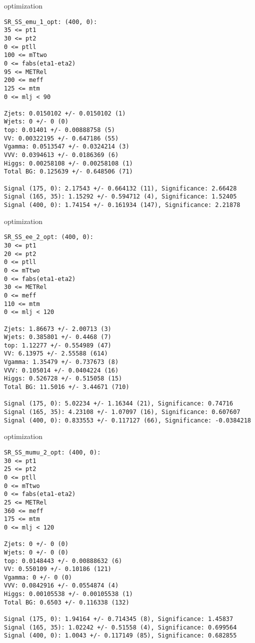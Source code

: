 \begin{frame}[fragile]{optimization}
\tiny
\begin{verbatim}
SR_SS_emu_1_opt: (400, 0):
35 <= pt1
30 <= pt2
0 <= ptll
100 <= mTtwo
0 <= fabs(eta1-eta2)
95 <= METRel
200 <= meff
125 <= mtm
0 <= mlj < 90

Zjets: 0.0150102 +/- 0.0150102 (1)
Wjets: 0 +/- 0 (0)
top: 0.01401 +/- 0.00888758 (5)
VV: 0.00322195 +/- 0.647186 (55)
Vgamma: 0.0513547 +/- 0.0324214 (3)
VVV: 0.0394613 +/- 0.0186369 (6)
Higgs: 0.00258108 +/- 0.00258108 (1)
Total BG: 0.125639 +/- 0.648506 (71)

Signal (175, 0): 2.17543 +/- 0.664132 (11), Significance: 2.66428
Signal (165, 35): 1.15292 +/- 0.594712 (4), Significance: 1.52405
Signal (400, 0): 1.74154 +/- 0.161934 (147), Significance: 2.21878
\end{verbatim}
\end{frame}

\begin{frame}[fragile]{optimization}
\tiny
\begin{verbatim}
SR_SS_ee_2_opt: (400, 0):
30 <= pt1
20 <= pt2
0 <= ptll
0 <= mTtwo
0 <= fabs(eta1-eta2)
30 <= METRel
0 <= meff
110 <= mtm
0 <= mlj < 120

Zjets: 1.86673 +/- 2.00713 (3)
Wjets: 0.385801 +/- 0.4468 (7)
top: 1.12277 +/- 0.554989 (47)
VV: 6.13975 +/- 2.55588 (614)
Vgamma: 1.35479 +/- 0.737673 (8)
VVV: 0.105014 +/- 0.0404224 (16)
Higgs: 0.526728 +/- 0.515058 (15)
Total BG: 11.5016 +/- 3.44671 (710)

Signal (175, 0): 5.02234 +/- 1.16344 (21), Significance: 0.74716
Signal (165, 35): 4.23108 +/- 1.07097 (16), Significance: 0.607607
Signal (400, 0): 0.833553 +/- 0.117127 (66), Significance: -0.0384218
\end{verbatim}
\end{frame}

\begin{frame}[fragile]{optimization}
\tiny
\begin{verbatim}
SR_SS_mumu_2_opt: (400, 0):
30 <= pt1
25 <= pt2
0 <= ptll
0 <= mTtwo
0 <= fabs(eta1-eta2)
25 <= METRel
360 <= meff
175 <= mtm
0 <= mlj < 120

Zjets: 0 +/- 0 (0)
Wjets: 0 +/- 0 (0)
top: 0.0148443 +/- 0.00888632 (6)
VV: 0.550109 +/- 0.10186 (121)
Vgamma: 0 +/- 0 (0)
VVV: 0.0842916 +/- 0.0554874 (4)
Higgs: 0.00105538 +/- 0.00105538 (1)
Total BG: 0.6503 +/- 0.116338 (132)

Signal (175, 0): 1.94164 +/- 0.714345 (8), Significance: 1.45837
Signal (165, 35): 1.02242 +/- 0.51558 (4), Significance: 0.699564
Signal (400, 0): 1.0043 +/- 0.117149 (85), Significance: 0.682855
\end{verbatim}
\end{frame}

